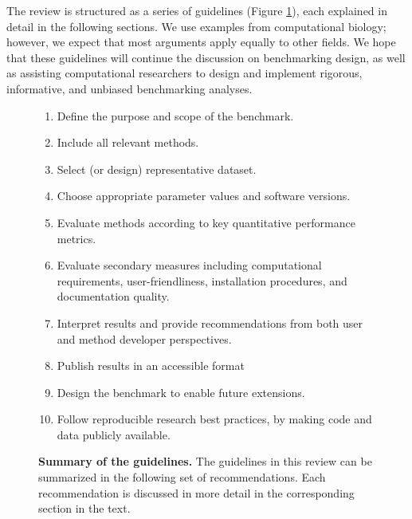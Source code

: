 The review is structured as a series of guidelines (Figure \ref{fig:summary_guidelines}), each explained in detail in the following sections. We use examples from computational biology; however, we expect that most arguments apply equally to other fields. We hope that these guidelines will continue the discussion on benchmarking design, as well as assisting computational researchers to design and implement rigorous, informative, and unbiased benchmarking analyses.


\begin{figure}[htb!]
	\caption{\textbf{Summary of the guidelines.} The guidelines in this review can be summarized in the following set of recommendations. Each recommendation is discussed in more detail in the corresponding section in the text.}
	\begin{tcolorbox}
		\begin{enumerate}
			\item Define the purpose and scope of the benchmark.
			\item Include all relevant methods.
			\item Select (or design) representative dataset.
			\item Choose appropriate parameter values and software versions.
			\item Evaluate methods according to key quantitative performance metrics.
			\item Evaluate secondary measures including computational requirements, user-friendliness, installation procedures, and documentation quality.
			\item Interpret results and provide recommendations from both user and method developer perspectives.
			\item Publish results in an accessible format
			\item Design the benchmark to enable future extensions.
			\item Follow reproducible research best practices, by making code and data publicly available.
		\end{enumerate}
  \end{tcolorbox}
	\label{fig:summary_guidelines}
\end{figure}